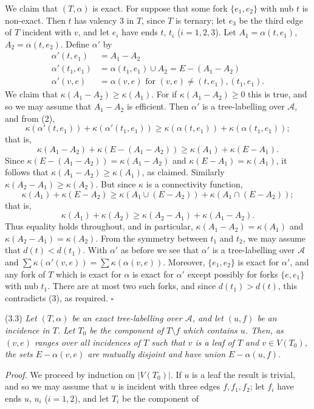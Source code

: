 We claim that $(T, \alpha)$ is exact. For suppose that some fork $\{e_1, e_2\}$ with nub $t$ is non-exact. Then $t$ has valency 3 in $T$, since $T$ is ternary; let $e_3$ be the third edge of $T$ incident with $v$, and let $e_i$ have ends $t$, $t_i$ ($i = 1, 2, 3$). Let $A_1 = \alpha(t, e_1)$, $A_2 = \alpha(t, e_2)$. Define $\alpha'$ by
\begin{align*}
\alpha'(t, e_1) &= A_1 - A_2 \\
\alpha'(t_1, e_1) &= \alpha(t_1, e_1) \cup A_2 = E - (A_1 - A_2) \\
\alpha'(v, e) &= \alpha(v, e) \text{ for } (v, e) \ne (t, e_1), (t_1, e_1).
\end{align*}
We claim that $\kappa(A_1 - A_2) \ge \kappa(A_1)$. For if $\kappa(A_1 - A_2) \ge 0$ this is true, and so we may assume that $A_1 - A_2$ is efficient. Then $\alpha'$ is a tree-labelling over $\mathscr{A}$, and from (2),
\begin{equation*}
\kappa(\alpha'(t, e_1)) + \kappa(\alpha'(t_1, e_1)) \ge \kappa(\alpha(t, e_1)) + \kappa(\alpha(t_1, e_1));
\end{equation*}
that is,
\begin{equation*}
\kappa(A_1 - A_2) + \kappa(E - (A_1 - A_2)) \ge \kappa(A_1) + \kappa(E - A_1).
\end{equation*}
Since $\kappa(E - (A_1 - A_2)) = \kappa(A_1 - A_2)$ and $\kappa(E - A_1) = \kappa(A_1)$, it follows that $\kappa(A_1 - A_2) \ge \kappa(A_1)$, as claimed. Similarly $\kappa(A_2 - A_1) \ge \kappa(A_2)$. But since $\kappa$ is a connectivity function,
\begin{equation*}
\kappa(A_1) + \kappa(E - A_2) \ge \kappa(A_1 \cup (E - A_2)) + \kappa(A_1 \cap (E - A_2));
\end{equation*}
that is,
\begin{equation*}
\kappa(A_1) + \kappa(A_2) \ge \kappa(A_2 - A_1) + \kappa(A_1 - A_2).
\end{equation*}
Thus equality holds throughout, and in particular, $\kappa(A_1 - A_2) = \kappa(A_1)$ and $\kappa(A_2 - A_1) = \kappa(A_2)$. From the symmetry between $t_1$ and $t_2$, we may assume that $d(t) < d(t_1)$. With $\alpha'$ as before we see that $\alpha'$ is a tree-labelling over $\mathscr{A}$ and $\sum \kappa(\alpha'(v, e)) = \sum \kappa(\alpha(v, e))$. Moreover, $\{e_1, e_2\}$ is exact for $\alpha'$, and any fork of $T$ which is exact for $\alpha$ is exact for $\alpha'$ except possibly for forks $\{e, e_1\}$ with nub $t_1$. There are at most two such forks, and since $d(t_1) > d(t)$, this contradicts (3), as required. $\square$

\stmt
(3.3) \textit{Let $(T, \alpha)$ be an exact tree-labelling over $\mathscr{A}$, and let $(u, f)$ be an incidence in $T$. Let $T_0$ be the component of $T \setminus f$ which contains $u$. Then, as $(v, e)$ ranges over all incidences of $T$ such that $v$ is a leaf of $T$ and $v \in V(T_0)$, the sets $E - \alpha(v, e)$ are mutually disjoint and have union $E - \alpha(u, f)$.}

\textit{Proof.} We proceed by induction on $|V(T_0)|$. If $u$ is a leaf the result is trivial, and so we may assume that $u$ is incident with three edges $f, f_1, f_2$; let $f_i$ have ends $u$, $u_i$ ($i = 1, 2$), and let $T_i$ be the component of
